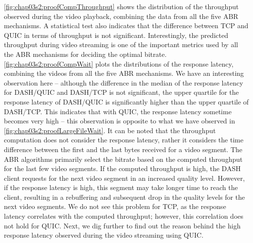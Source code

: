 \fig\ref{fig:chap03s2:proofCompThroughput} shows the distribution of the throughput observed during the video playback, combining the data from all the five \ac{ABR} mechanisms. A statistical test also indicates that the difference between \ac{TCP} and \ac{QUIC} in terms of throughput is not significant. Interestingly, the predicted throughput during video streaming is one of the important metrics used by all the \ac{ABR} mechanisms for deciding the optimal bitrate. \fig\ref{fig:chap03s2:proofCompWait} plots the distributions of the response latency, combining the videos from all the five \ac{ABR} mechanisms. We have an interesting observation here -- although the difference in the median of the response latency for DASH/QUIC and DASH/TCP is not significant,  the upper quartile for the response latency of DASH/QUIC is significantly higher than the upper quartile of DASH/TCP. This indicates that with \ac{QUIC}, the response latency sometime becomes very high -- this observation is opposite to what we have observed in \fig\ref{fig:chap03s2:proofLargeFileWait}. It can be noted that the throughput computation does not consider the response latency, rather it considers the time difference between the first and the last bytes received for a video segment. The \ac{ABR} algorithms primarily select the bitrate based on the computed throughput for the last few video segments. If the computed throughput is high, the DASH client requests for the next video segment in an increased quality level. However, if the response latency is high, this segment may take longer time to reach the client, resulting in a rebuffering and subsequent drop in the quality levels for the next video segments. We do not see this problem for \ac{TCP}, as the response latency correlates with the computed throughput; however, this correlation does not hold for \ac{QUIC}. Next, we dig further to find out the reason behind the high response latency observed during the video streaming using \ac{QUIC}.

